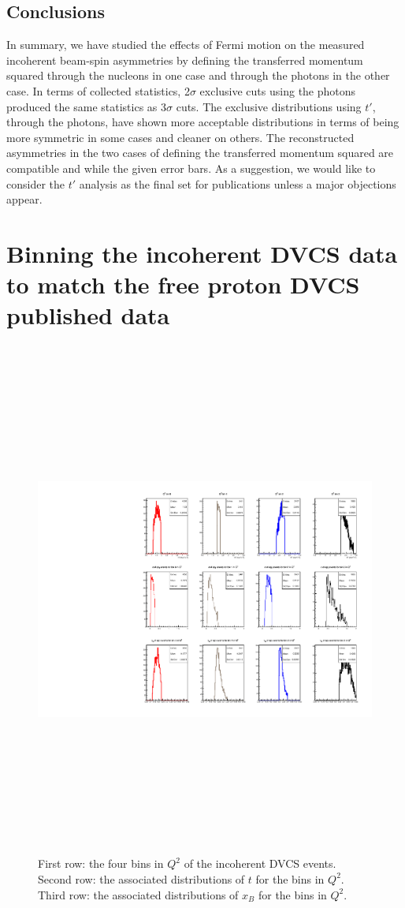 \section*{Conclusions}
In summary, we have studied the effects of Fermi motion on the measured 
incoherent beam-spin asymmetries by defining the transferred momentum squared 
through the nucleons in one case and through the photons in the other case. In 
terms of collected statistics, 2$\sigma$ exclusive cuts using the photons 
produced the same statistics as 3$\sigma$ cuts. The exclusive distributions 
using $t'$, through the photons, have shown more acceptable distributions in 
terms of being more symmetric in some cases and cleaner on others. The 
reconstructed asymmetries in the two cases of defining the transferred momentum 
squared are compatible and while the given error bars. As a suggestion, we 
would like to consider the $t'$ analysis as the final set for publications 
unless a major objections appear.

\chapter{Binning the incoherent DVCS data to match the free proton DVCS 
published data}


\begin{figure}[h!]
   \centering
   \includegraphics[height=17.0cm]{4D-incoh-bin/4D-Q2_InCoh_bins.pdf}
   \caption{First row: the four bins in $Q^2$ of the incoherent DVCS events.  
   Second row: the associated distributions of $t$ for the bins in $Q^2$.  
   Third row: the associated distributions of $x_B$ for the bins in $Q^2$.}
\label{fig:incoh_Q2-bins-freep}
\end{figure}

